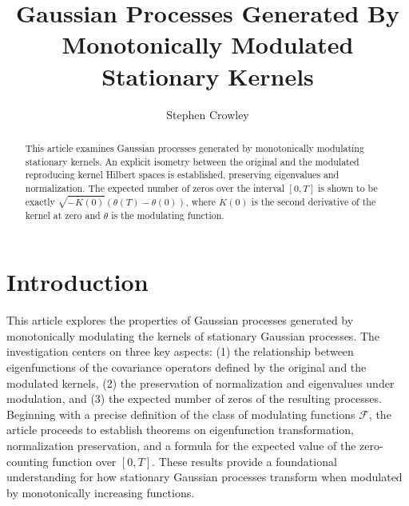 \documentclass{mc}
\begin{document}

\title[Modulated Gaussian Processes]{Gaussian Processes Generated By Monotonically Modulated Stationary Kernels}

\author[Stephen Crowley]{Stephen Crowley\corrauth}

\begin{abstract}
This article examines Gaussian processes generated by monotonically modulating stationary kernels. An explicit isometry 
between the original and the modulated reproducing kernel Hilbert spaces is established, preserving eigenvalues and normalization. 
The expected number of zeros over the interval $[0,T]$ is shown to be exactly $\sqrt{-\ddot{K}(0)}(\theta(T)-\theta(0))$, 
where $\ddot{K}(0)$ is the second derivative of the kernel at zero and $\theta$ is the modulating function.
\end{abstract}



\maketitle

\section{Introduction}

This article explores the properties of Gaussian
processes\cite{correlationTheoryOfStationaryRandomProcesses}\cite{stationaryAndRelatedStochasticProcesses}
generated by
monotonically modulating the kernels of stationary Gaussian processes. The
investigation centers on three key aspects: (1) the relationship between
eigenfunctions of the covariance operators defined by the original and the modulated kernels, 
(2) the preservation of normalization and eigenvalues under modulation, and (3) 
the expected number of zeros of the resulting processes. Beginning with a 
precise definition of the class of modulating functions $\mathcal{F}$, the 
article proceeds to establish theorems on eigenfunction transformation, normalization
preservation, and a formula for the expected value of the zero-counting function over $[0,T]$. 
These results provide a foundational understanding for how stationary Gaussian processes
transform when modulated by monotonically increasing functions.
\end{document}
